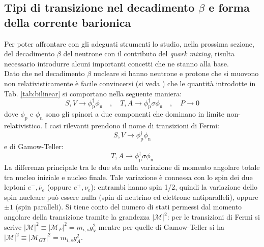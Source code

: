 \documentclass{subnucbo}
\begin{document}
\subsection{Tipi di transizione nel decadimento $\beta$ e forma della corrente barionica}
Per poter affrontare con gli adeguati strumenti lo studio, nella prossima sezione, del decadimento $\beta$ del neutrone con il contributo del \textit{quark mixing}, risulta necessario introdurre alcuni importanti concetti che ne stanno alla base. \\
Dato che nel decadimento $\beta$ nucleare si hanno neutrone e protone che si muovono non relativisticamente è facile convincersi (si veda \cite{ref:greiner}) che le quantità introdotte in Tab. \ref{tab:bilinear} si comportano nella seguente maniera:
\begin{equation}
        S , V \rightarrow \phi _ { \mathrm { p } } ^ { \dagger } \phi _ { \mathrm { n } } \quad , \quad T , A \rightarrow \phi _ { \mathrm { p } } ^ { \dagger } \sigma \phi _ { \mathrm { n } } \quad , \quad P \rightarrow 0
\end{equation}
dove $\phi_{p}$ e $\phi_{n}$ sono gli spinori a due componenti che dominano in limite non-relativistico. I casi rilevanti prendono il nome di transizioni di Fermi:
\begin{equation}
        S , V \rightarrow \phi _ { \mathrm { p } } ^ { \dagger } \phi _ { \mathrm { n } }
\end{equation}
e di Gamow-Teller:
\begin{equation}
        T , A \rightarrow \phi _ { \mathrm { p } } ^ { \dagger } \sigma \phi _ { \mathrm { n } }
\end{equation}
La differenza principale tra le due sta nella variazione di momento angolare totale tra nucleo iniziale e nucleo finale. Tale variazione è connessa con lo spin dei due leptoni $e ^ { - } , \overline { \nu } _ { e }$ (oppure $e^{+}, \nu_{e}$): entrambi hanno spin 1/2, quindi la variazione dello spin nucleare può essere nulla (spin di neutrino ed elettrone antiparalleli), oppure $\pm1$ (spin paralleli). Si tiene conto del numero di stati permessi dal momento angolare della transizione tramite la grandezza $|\mathcal{M}|^{2}$: per le transizioni di Fermi si scrive $| \mathcal { M } | ^ { 2 } \equiv \left| \mathcal { M } _ { F } \right| ^ { 2 } = m _ { i , s } g _ { V } ^ { 2 }$ mentre per quelle di Gamow-Teller si ha $| \mathcal { M } | ^ { 2 } \equiv \left| \mathcal { M } _ { G T } \right| ^ { 2 } = m _ { i , s } g _ { A } ^ { 2 }$.
\end{document}
